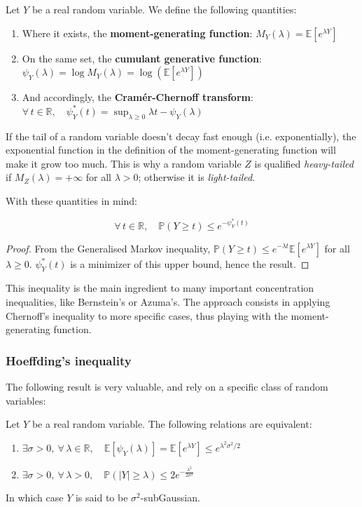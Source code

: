 \begin{defi}
  Let $Y$ be a real random variable. We define the following quantities:
  \begin{enumerate}
  \item Where it exists, the \textbf{moment-generating function}: $M_Y(\lambda) = \mathbb{E}[e^{\lambda Y}]$
  \item On the same set, the \textbf{cumulant generative function}: $\psi_Y(\lambda) = \log M_Y(\lambda) = \log( \mathbb{E}[e^{\lambda Y}])$
  \item And accordingly, the \textbf{Cramér-Chernoff transform}: $\forall \, t \in \mathbb{R},\quad \psi_Y^*(t) = \sup_{\lambda \geq 0} \lambda t - \psi_Y(\lambda)$
  \end{enumerate}
\end{defi}

If the tail of a random variable doesn't decay fast enough (i.e. exponentially), the exponential function in the definition of the moment-generating function will make it grow too much. This is why a random variable $Z$ is qualified \emph{heavy-tailed} if $M_Z(\lambda) = + \infty$ for all $\lambda > 0$; otherwise it is \emph{light-tailed}.

With these quantities in mind:
\begin{thm}
  $$\forall \, t \in \mathbb{R},\quad \mathbb{P}(Y \geq t) \leq e^{- \psi_Y^*(t)}$$
\end{thm}

\begin{proof}
  From the Generalised Markov inequality, $\mathbb{P}(Y \geq t) \leq e^{-\lambda t} \mathbb{E}[e^{\lambda Y}]$ for all $\lambda \geq 0$. $\psi_Y^*(t)$ is a minimizer of this upper bound, hence the result.
\end{proof}

This inequality is the main ingredient to many important concentration inequalities, like Bernstein's or Azuma's. The approach consists in applying Chernoff's inequality to more specific cases, thus playing with the moment-generating function.

\subsubsection{Hoeffding's inequality}

The following result is very valuable, and rely on a specific class of random variables:

\begin{defi}
  Let $Y$ be a real random variable. The following relations are equivalent:
  \begin{enumerate}
  \item $\exists \sigma > 0,\ \forall \, \lambda \in \mathbb{R},\quad \mathbb{E}[\psi_Y(\lambda)] = \mathbb{E}[e^{\lambda Y}] \leq e^{\lambda^2 \sigma^2 / 2}$
  \item $\exists \sigma > 0,\ \forall \, \lambda > 0,\quad \mathbb{P}\left(|Y| \geq \lambda \right) \leq 2e^{-\frac{\lambda^2}{2\sigma^2}}$
  \end{enumerate}
  In which case $Y$ is said to be $\sigma^2$-subGaussian.
\end{defi}

